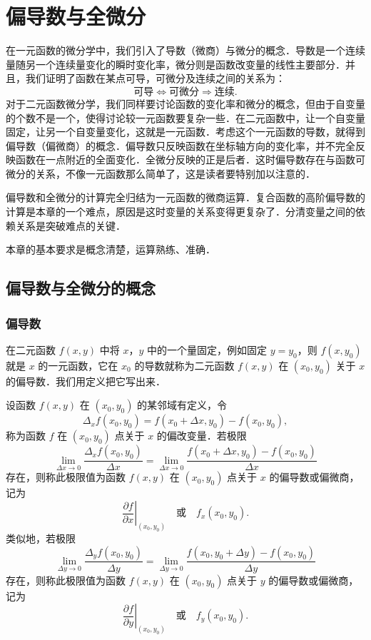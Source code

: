 \chapter{偏导数与全微分}

在一元函数的微分学中，我们引入了导数（微商）与微分的概念．导数是一个连续量随另一个连续量变化的瞬时变化率，微分则是函数改变量的线性主要部分．并且，我们证明了函数在某点可导，可微分及连续之间的关系为：
\[
\text{可导}\Leftrightarrow\text{可微分}\Rightarrow\text{连续}.
\]
对于二元函数微分学，我们同样要讨论函数的变化率和微分的概念，但由于自变量的个数不是一个，使得讨论较一元函数要复杂一些．在二元函数中，让一个自变量固定，让另一个自变量变化，这就是一元函数．考虑这个一元函数的导数，就得到偏导数（偏微商）的概念．偏导数只反映函数在坐标轴方向的变化率，并不完全反映函数在一点附近的全面变化．全微分反映的正是后者．这时偏导数存在与函数可微分的关系，不像一元函数那么简单了，这是读者要特别加以注意的．

偏导数和全微分的计算完全归结为一元函数的微商运算．复合函数的高阶偏导数的计算是本章的一个难点，原因是这时变量的关系变得更复杂了．分清变量之间的依赖关系是突破难点的关键．

本章的基本要求是概念清楚，运算熟练、准确．

\section{偏导数与全微分的概念}

\subsection{偏导数}

在二元函数 $f(x,y)$ 中将 $x$，$y$ 中的一个量固定，例如固定 $y=y_{0}$，则 $f(x,y_{0})$ 就是 $x$ 的一元函数，它在 $x_{0}$ 的导数就称为二元函数 $f(x,y)$ 在 $(x_{0},y_{0})$ 关于 $x$ 的偏导数．我们用定义把它写出来．

\begin{definition}\label{def:16-1}
设函数 $f(x,y)$ 在 $(x_{0},y_{0})$ 的某邻域有定义，令
\[
\Delta_{x}f(x_{0},y_{0})=f(x_{0}+\Delta x,y_{0})-f(x_{0},y_{0}),
\]
称为函数 $f$ 在 $(x_{0},y_{0})$ 点关于 $x$ 的偏改变量．若极限
\[
\lim_{\Delta x\to 0}\frac{\Delta_{x}f(x_{0},y_{0})}{\Delta x}=\lim_{\Delta x\to 0}\frac{f(x_{0}+\Delta x,y_{0})-f(x_{0},y_{0})}{\Delta x}
\]
存在，则称此极限值为函数 $f(x,y)$ 在 $(x_{0},y_{0})$ 点关于 $x$ 的偏导数或偏微商，记为
\[
\left.\frac{\partial f}{\partial x}\right|_{(x_{0},y_{0})}\quad\text{或}\quad f_{x}(x_{0},y_{0}).
\]
类似地，若极限
\[
\lim_{\Delta y\to 0}\frac{\Delta_{y}f(x_{0},y_{0})}{\Delta y}=\lim_{\Delta y\to 0}\frac{f(x_{0},y_{0}+\Delta y)-f(x_{0},y_{0})}{\Delta y}
\]
存在，则称此极限值为函数 $f(x,y)$ 在 $(x_{0},y_{0})$ 点关于 $y$ 的偏导数或偏微商，记为
\[
\left.\frac{\partial f}{\partial y}\right|_{(x_{0},y_{0})}\quad\text{或}\quad f_{y}(x_{0},y_{0}).
\]
\end{definition}

